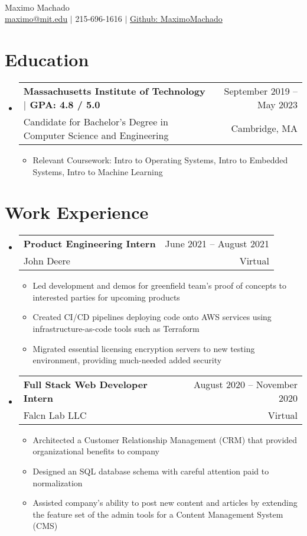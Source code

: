 \documentclass[letterpaper,12pt]{article} %
\makeatletter
\newcommand{\CVItem}[1]{
  \item\small{
    {#1 \vspace{-2pt}}
  }
}
\newcommand{\CVSubheading}[4]{
  \vspace{-2pt}\item
    \begin{tabular*}{0.97\textwidth}[t]{l@{\extracolsep{\fill}}r}
      \textbf{#1} & #2 \\
      \small#3 & \small #4 \\
    \end{tabular*}\vspace{-7pt}
}
\newcommand{\CVSubHeadingListStart}{\begin{itemize}[leftmargin=0.15in, label={}]} %
\newcommand{\CVSubHeadingListEnd}{\end{itemize}}
\newcommand{\CVItemListStart}{\begin{itemize}}
\newcommand{\CVItemListEnd}{\end{itemize}\vspace{-5pt}}
\makeatother
\begin{document}

\begin{minipage}[c]{0.05\textwidth}
  \-\
\end{minipage}

\begin{center}
  \Huge Maximo Machado \\ \vspace{1pt} %
  \small
  \href{mailto:maximo@mit.edu}{maximo@mit.edu} $|$
  215-696-1616 $|$
  \href{https://github.com/MaximoMachado}{Github: MaximoMachado}
\end{center}
\vspace{-10pt} %

\section{Education}
\CVSubHeadingListStart
\CVSubheading
{{Massachusetts Institute of Technology $|$ \small{GPA: 4.8 / 5.0}}}{September 2019 -- May 2023}
{Candidate for Bachelor's Degree in Computer Science and Engineering}{Cambridge, MA}

\CVItemListStart
\CVItem{Relevant Coursework:
  Intro to Operating Systems,
  Intro to Embedded Systems,
  Intro to Machine Learning}
\CVItemListEnd
\CVSubHeadingListEnd

\vspace{-10pt} %
\section{Work Experience}
\CVSubHeadingListStart
\CVSubheading
{Product Engineering Intern}{June 2021 -- August 2021}
{John Deere}{Virtual}
\CVItemListStart
\CVItem{Led development and demos for greenfield team's proof of concepts to interested parties for upcoming products}
\CVItem{Created CI/CD pipelines deploying code onto AWS services using infrastructure-as-code tools such as Terraform}
\CVItem{Migrated essential licensing encryption servers to new testing environment, providing much-needed added security}
\CVItemListEnd
\CVSubheading
{Full Stack Web Developer Intern}{August 2020 -- November 2020}
{Falcn Lab LLC}{Virtual}
\CVItemListStart
\CVItem{Architected a Customer Relationship Management (CRM) that provided organizational benefits to company}
\CVItem{Designed an SQL database schema with careful attention paid to normalization}
\CVItem{Assisted company's ability to post new content and articles by extending the feature set of the admin tools for a Content Management System (CMS)}
\CVItemListEnd
\CVSubHeadingListEnd
\end{document}
